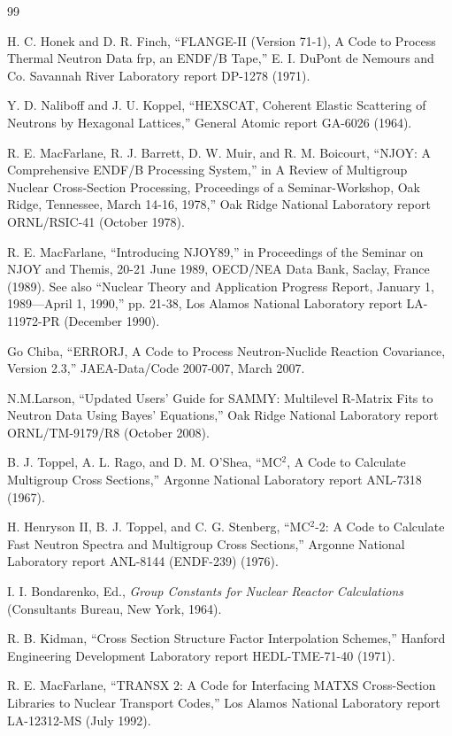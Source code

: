 \documentclass[11pt,twoside]{NJOYMan}
\begin{document}
\begin{thebibliography}{99}
\begin{singlespace}
 H. C. Honek and D. R. Finch, ``FLANGE-II
  (Version 71-1), A Code to Process Thermal Neutron Data frp, an
  ENDF/B Tape,'' E. I. DuPont de Nemours and Co. Savannah River
  Laboratory report DP-1278 (1971).

 Y. D. Naliboff and J. U. Koppel, ``HEXSCAT,
  Coherent Elastic Scattering of Neutrons by Hexagonal Lattices,''
  General Atomic report GA-6026 (1964).

 R. E. MacFarlane, R. J. Barrett, D. W. Muir, and
  R. M. Boicourt, ``NJOY: A Comprehensive ENDF/B Processing System,''
  in A Review of Multigroup Nuclear Cross-Section Processing,
  Proceedings of a Seminar-Workshop, Oak Ridge, Tennessee,
  March 14-16, 1978,'' Oak Ridge National Laboratory report
  ORNL/RSIC-41 (October 1978).

 R. E. MacFarlane, ``Introducing NJOY89,'' in
  Proceedings of the Seminar on NJOY and Themis, 20-21 June 1989,
  OECD/NEA Data Bank, Saclay, France (1989).  See also ``Nuclear
  Theory and Application Progress Report, January 1, 1989---April
  1, 1990,'' pp. 21-38, Los Alamos National Laboratory report
  LA-11972-PR (December 1990).

 Go Chiba, ``ERRORJ, A Code to Process Neutron-Nuclide
  Reaction Covariance, Version 2.3,'' JAEA-Data/Code 2007-007, March 2007.

 N.M.Larson, ``Updated Users' Guide for SAMMY:
  Multilevel R-Matrix Fits to Neutron Data Using Bayes' Equations,''
  Oak Ridge National Laboratory report ORNL/TM-9179/R8 (October 2008).

 B. J. Toppel, A. L. Rago, and D. M. O'Shea,
  ``MC$^2$, A Code to Calculate Multigroup Cross Sections,''
  Argonne National Laboratory report ANL-7318 (1967).

 H. Henryson II, B. J. Toppel, and C. G. Stenberg,
  ``MC$^2$-2: A Code to Calculate Fast Neutron Spectra and Multigroup
  Cross Sections,'' Argonne National Laboratory report ANL-8144
  (ENDF-239) (1976).

 I. I. Bondarenko, Ed., {\it Group Constants for Nuclear
  Reactor Calculations} (Consultants Bureau, New York, 1964).

 R. B. Kidman, ``Cross Section Structure Factor
   Interpolation Schemes,'' Hanford Engineering Development
   Laboratory report HEDL-TME-71-40 (1971).

 R. E. MacFarlane, ``TRANSX 2: A Code for Interfacing
   MATXS Cross-Section Libraries to Nuclear Transport Codes,''
   Los Alamos National Laboratory report LA-12312-MS (July 1992).


\end{singlespace}
\end{thebibliography}
\end{document}
